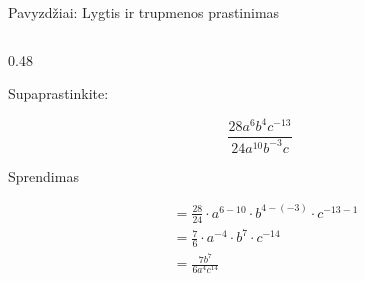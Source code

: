 \documentclass[aspectratio=169,10pt]{beamer}
\begin{document}
\begin{frame}{Pavyzdžiai: Lygtis ir trupmenos prastinimas}
\begin{columns}[T]
\begin{column}{0.48\textwidth}
            \begin{example}[2]

                Supaprastinkite:

                \[
                \frac{28a^6b^4c^{-13}}
                {24a^{10}b^{-3}c}
                \]

            \end{example}

            \begin{block}{Sprendimas}

                \begin{align*}
                    &=
                    \frac{28}{24}
                    \cdot
                    a^{6-10}
                    \cdot
                    b^{4-(-3)}
                    \cdot
                    c^{-13-1}
                    \\[3pt]
                    &=
                    \frac76
                    \cdot
                    a^{-4}
                    \cdot
                    b^7
                    \cdot
                    c^{-14}
                    \\[3pt]
                    &=
                    \frac{7b^7}{6a^4c^{14}}
                \end{align*}

            \end{block}

        \end{column}

    \end{columns}

\end{frame}

\end{document}
